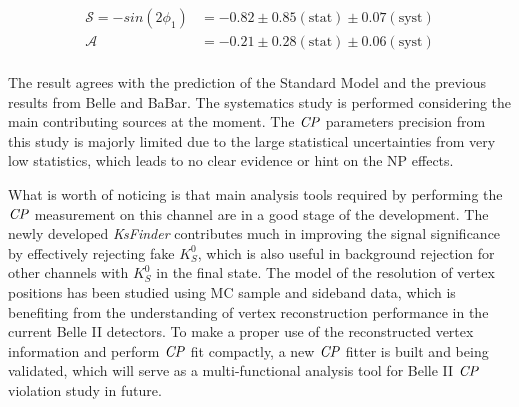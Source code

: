 \begin{equation}\label{eq:data_fit_cp}
\begin{split}
\mathcal{S}=- sin(2\phi_1) & = -0.82 \pm 0.85(\text{stat}) \pm 0.07(\text{syst}) \\
\mathcal{A} & = -0.21\pm 0.28(\text{stat}) \pm 0.06(\text{syst})\\
\end{split}
\end{equation}  

The result agrees with the prediction of the Standard Model and the previous results from Belle and BaBar. The systematics study is performed considering the main contributing sources at the moment. The $\it{CP}$ parameters precision from this study is majorly limited due to the large statistical uncertainties from very low statistics, which leads to no clear evidence or hint on the NP effects. 
 
What is worth of noticing is that main analysis tools required by performing the $\it{CP}$ measurement on this channel are in a good stage of the development. The newly developed \textit{KsFinder} contributes much in improving the signal significance by effectively rejecting fake $K_S^0$, which is also useful in background rejection for other channels with $K_S^0$ in the final state.  The model of the resolution of vertex positions has been studied using MC sample and sideband data, which is benefiting from the understanding of vertex reconstruction performance in the current Belle II detectors. To make a proper use of the reconstructed vertex information and perform $\it{CP}$ fit compactly, a new $\it{CP}$ fitter is built and being validated, which will serve as a multi-functional analysis tool for Belle II $\it{CP}$ violation study in future. 
 

